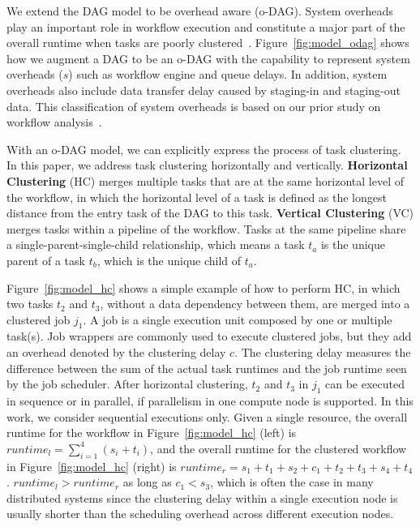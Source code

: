 \documentclass{IOS-Book-Article}
\begin{document}
We extend the DAG model to be overhead aware (o-DAG). System overheads play an important role in workflow execution and constitute a major part of the overall runtime when tasks are poorly clustered~\cite{Chen2011}. Figure~\ref{fig:model_odag} shows how we augment a DAG to be an o-DAG with the capability to represent system overheads ($s$) such as workflow engine and queue delays. In addition, system overheads also include data transfer delay caused by staging-in and staging-out data. This classification of system overheads is based on our prior study on workflow analysis~\cite{Chen2011}. 

With an o-DAG model, we can explicitly express the process of task clustering. In this paper, we address task clustering horizontally and vertically. \textbf{Horizontal Clustering} (HC) merges multiple tasks that are at the same horizontal level of the workflow, in which the horizontal level of a task is defined as the longest distance from the entry task of the DAG to this task. \textbf{Vertical Clustering} (VC) merges tasks within a pipeline of the workflow. Tasks at the same pipeline share a single-parent-single-child relationship, which means a task $t_a$ is the unique parent of a task $t_b$, which is the unique child of $t_a$. 

Figure~\ref{fig:model_hc} shows a simple example of how to perform HC, in which two tasks $t_2$ and $t_3$, without a data dependency between them, are merged into a clustered job $j_1$. A job is a single execution unit composed by one or multiple task(s). Job wrappers are commonly used to execute clustered jobs, but they add an overhead denoted by the clustering delay $c$. The clustering delay measures the difference between the sum of the actual task runtimes and the job runtime seen by the job scheduler. 
After horizontal clustering, $t_2$ and $t_3$ in $j_1$ can be executed in sequence or in parallel, if parallelism in one compute node is supported. In this work, we consider sequential executions only. Given a single resource, the overall runtime for the workflow in Figure~\ref{fig:model_hc} (left) is $runtime_l= \sum_{i=1}^{4}(s_i+t_i)$, and the overall runtime for the clustered workflow in Figure~\ref{fig:model_hc} (right) is $runtime_r=s_1+t_1+s_2+c_1+t_2+t_3+s_4+t_4$.  $runtime_l > runtime_r$ as long as $c_1 < s_3$, which is often the case in many distributed systems since the clustering delay within a single execution node is usually shorter than the scheduling overhead across different execution nodes. 
\end{document}
